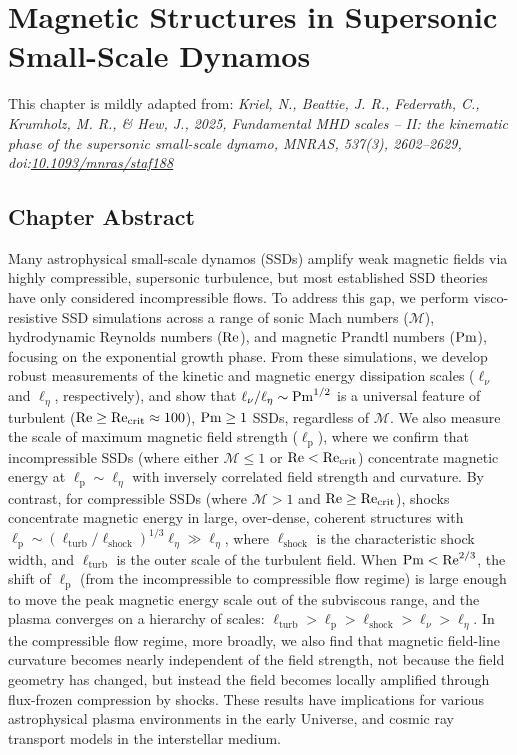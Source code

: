 \chapter{Magnetic Structures in Supersonic Small-Scale Dynamos}
\label{chapter:ssd-exp}

\noindent\hfill\parbox{0.865\textwidth}{\raggedleft
This chapter is mildly adapted from:
\textit{Kriel, N., Beattie, J. R., Federrath, C., Krumholz, M. R., \& Hew, J., 2025, Fundamental MHD scales -- II: the kinematic phase of the supersonic small-scale dynamo, MNRAS, 537(3), 2602–2629, doi:\href{https://doi.org/10.1093/mnras/staf188}{10.1093/mnras/staf188}}
}\par

\section{Chapter Abstract}

Many astrophysical small-scale dynamos (SSDs) amplify weak magnetic fields via highly compressible, supersonic turbulence, but most established SSD theories have only considered incompressible flows. To address this gap, we perform visco-resistive SSD simulations across a range of sonic Mach numbers ($\mathcal{M}$), hydrodynamic Reynolds numbers ($\mathrm{Re}$), and magnetic Prandtl numbers ($\mathrm{Pm}$), focusing on the exponential growth phase. From these simulations, we develop robust measurements of the kinetic and magnetic energy dissipation scales ($\ell_\nu$ and $\ell_\eta$, respectively), and show that $\ell_\nu/\ell_\eta \sim \mathrm{Pm}^{1/2}$ is a universal feature of turbulent ($\mathrm{Re} \geq \mathrm{Re}_\mathrm{crit} \approx 100$), $\mathrm{Pm} \geq 1$ SSDs, regardless of $\mathcal{M}$. We also measure the scale of maximum magnetic field strength ($\ell_\mathrm{p}$), where we confirm that incompressible SSDs (where either $\mathcal{M} \leq 1$ or $\mathrm{Re} < \mathrm{Re}_\mathrm{crit}$) concentrate magnetic energy at $\ell_\mathrm{p} \sim \ell_\eta$ with inversely correlated field strength and curvature. By contrast, for compressible SSDs (where $\mathcal{M} > 1$ and $\mathrm{Re} \geq \mathrm{Re}_\mathrm{crit}$), shocks concentrate magnetic energy in large, over-dense, coherent structures with $\ell_\mathrm{p} \sim (\ell_\mathrm{turb} / \ell_\mathrm{shock})^{1/3} \ell_\eta \gg \ell_\eta$, where $\ell_\mathrm{shock}$ is the characteristic shock width, and $\ell_\mathrm{turb}$ is the outer scale of the turbulent field. When $\mathrm{Pm} < \mathrm{Re}^{2/3}$, the shift of $\ell_\mathrm{p}$ (from the incompressible to compressible flow regime) is large enough to move the peak magnetic energy scale out of the subviscous range, and the plasma converges on a hierarchy of scales: $\ell_\mathrm{turb} > \ell_\mathrm{p} > \ell_\mathrm{shock} > \ell_\nu > \ell_\eta$. In the compressible flow regime, more broadly, we also find that magnetic field-line curvature becomes nearly independent of the field strength, not because the field geometry has changed, but instead the field becomes locally amplified through flux-frozen compression by shocks. These results have implications for various astrophysical plasma environments in the early Universe, and cosmic ray transport models in the interstellar medium.

